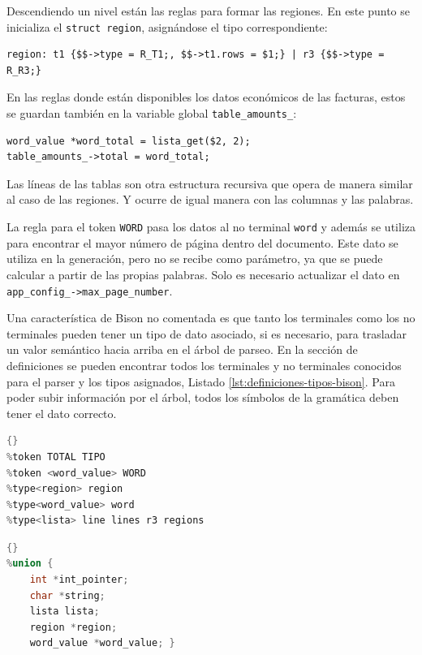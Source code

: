Descendiendo un nivel están las reglas para formar las regiones. En este punto se inicializa el \verb|struct region|, asignándose el tipo correspondiente:

\begin{lstlisting}[caption={},label={lst:guardando-regiones}]
region: t1 {$$->type = R_T1;, $$->t1.rows = $1;} | r3 {$$->type = R_R3;}
\end{lstlisting}

En las reglas donde están disponibles los datos económicos de las facturas, estos se guardan también en la variable global \verb|table_amounts_|:

\begin{lstlisting}[caption={},label={}]
word_value *word_total = lista_get($2, 2);
table_amounts_->total = word_total;
\end{lstlisting}

Las líneas de las tablas son otra estructura recursiva que opera de manera similar al caso de las regiones. Y ocurre de igual manera con las columnas y las palabras.

La regla para el token \verb|WORD| pasa los datos al no terminal \verb|word| y además se utiliza para encontrar el mayor número de página dentro del documento. Este dato se utiliza en la generación, pero no se recibe como parámetro, ya que se puede calcular a partir de las propias palabras. Solo es necesario actualizar el dato en \verb|app_config_->max_page_number|.

Una característica de Bison no comentada es que tanto los terminales como los no terminales pueden tener un tipo de dato asociado, si es necesario, para trasladar un valor semántico hacia arriba en el árbol de parseo. En la sección de definiciones se pueden encontrar todos los terminales y no terminales conocidos para el parser y los tipos asignados, Listado \ref{lst:definiciones-tipos-bison}. Para poder subir información por el árbol, todos los símbolos de la gramática deben tener el dato correcto.

\noindent\begin{minipage}{.45\textwidth}
    \begin{lstlisting}[language=C,caption={Definiciones de tipos para tokens y no terminales},frame=tlrb,label={lst:definiciones-tipos-bison}]{}
%token TOTAL TIPO
%token <word_value> WORD
%type<region> region
%type<word_value> word
%type<lista> line lines r3 regions
    \end{lstlisting}
\end{minipage}\hfill
\begin{minipage}{.45\textwidth}
    \begin{lstlisting}[language=C,caption={Tipo de variables compartidas entre Bison y Flex},frame=tlrb,label={lst:union-variables-compartidas}]{}
%union {
    int *int_pointer;
    char *string;
    lista lista;
    region *region;
    word_value *word_value; }
    \end{lstlisting}
\end{minipage}

